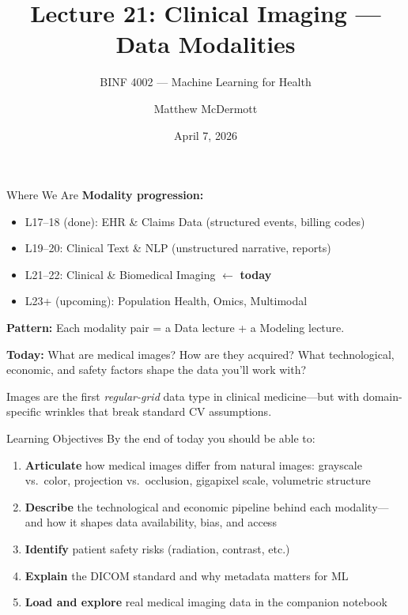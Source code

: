 \documentclass[aspectratio=169,10pt]{beamer}
\title{Lecture 21: Clinical Imaging --- Data Modalities}
\subtitle{BINF 4002 --- Machine Learning for Health}
\author{Matthew McDermott}
\institute{Dept.\ of Biomedical Informatics, Columbia University}
\date{April 7, 2026}
\begin{document}
\begin{frame}[noframenumbering]
\maketitle
\end{frame}

\begin{frame}{Where We Are}
\textbf{Modality progression:}
\begin{itemize}
    \item[\textcolor{columbiagray}{$\bullet$}] L17--18 (done): EHR \& Claims Data (structured events, billing codes)
    \item[\textcolor{columbiagray}{$\bullet$}] L19--20: Clinical Text \& NLP (unstructured narrative, reports)
    \item[\textcolor{columbiaaccent}{$\to$}] \alert{L21--22: Clinical \& Biomedical Imaging} $\gets$ \textbf{today}
    \item[\textcolor{columbiagray}{$\circ$}] L23+ (upcoming): Population Health, Omics, Multimodal
\end{itemize}

\vspace{0.4em}
\textbf{Pattern:} Each modality pair = a \textcolor{columbia}{Data} lecture + a \textcolor{columbiaaccent}{Modeling} lecture.

\vspace{0.3em}
\textbf{Today:} What are medical images? How are they acquired? What technological, economic, and safety factors shape the data you'll work with?

\vspace{0.3em}
Images are the first \emph{regular-grid} data type in clinical medicine---but with domain-specific wrinkles that break standard CV assumptions.
\end{frame}

\begin{frame}{Learning Objectives}
By the end of today you should be able to:
\begin{enumerate}
    \item \textbf{Articulate} how medical images differ from natural images: grayscale vs.\ color, projection vs.\ occlusion, gigapixel scale, volumetric structure
    \item \textbf{Describe} the technological and economic pipeline behind each modality---and how it shapes data availability, bias, and access
    \item \textbf{Identify} patient safety risks (radiation, contrast, etc.)
    \item \textbf{Explain} the DICOM standard and why metadata matters for ML
    \item \textbf{Load and explore} real medical imaging data in the companion notebook
\end{enumerate}
\end{frame}
\end{document}
